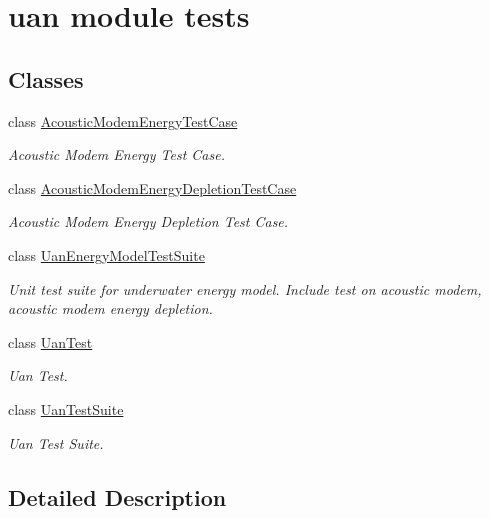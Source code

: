 \hypertarget{group__uan-test}{}\section{uan module tests}
\label{group__uan-test}
\subsection*{Classes}
\begin{DoxyCompactItemize}
\item 
class \hyperlink{classAcousticModemEnergyTestCase}{Acoustic\+Modem\+Energy\+Test\+Case}
\begin{DoxyCompactList}\small\item\em Acoustic Modem Energy Test Case. \end{DoxyCompactList}\item 
class \hyperlink{classAcousticModemEnergyDepletionTestCase}{Acoustic\+Modem\+Energy\+Depletion\+Test\+Case}
\begin{DoxyCompactList}\small\item\em Acoustic Modem Energy Depletion Test Case. \end{DoxyCompactList}\item 
class \hyperlink{classUanEnergyModelTestSuite}{Uan\+Energy\+Model\+Test\+Suite}
\begin{DoxyCompactList}\small\item\em Unit test suite for underwater energy model. Include test on acoustic modem, acoustic modem energy depletion. \end{DoxyCompactList}\item 
class \hyperlink{classUanTest}{Uan\+Test}
\begin{DoxyCompactList}\small\item\em Uan Test. \end{DoxyCompactList}\item 
class \hyperlink{classUanTestSuite}{Uan\+Test\+Suite}
\begin{DoxyCompactList}\small\item\em Uan Test Suite. \end{DoxyCompactList}\end{DoxyCompactItemize}


\subsection{Detailed Description}
